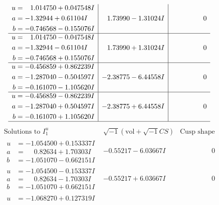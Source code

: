 \documentclass[1p]{elsarticle_modified}
\theoremstyle{definition}
\newcommand{\I}{\sqrt{-1}}
\begin{document}
$$\begin{array}{c|c|c}
\begin{aligned}
u &= \phantom{-}1.014750 + 0.047548 I \\
a &= -1.32944 + 0.61104 I \\
b &= -0.746568 - 0.155076 I\end{aligned}
 & \phantom{-}1.73990 - 1.31024 I & \phantom{-0.000000 } 0 \\ \hline\begin{aligned}
u &= \phantom{-}1.014750 - 0.047548 I \\
a &= -1.32944 - 0.61104 I \\
b &= -0.746568 + 0.155076 I\end{aligned}
 & \phantom{-}1.73990 + 1.31024 I & \phantom{-0.000000 } 0 \\ \hline\begin{aligned}
u &= -0.456859 + 0.862239 I \\
a &= -1.287040 - 0.504597 I \\
b &= -0.161070 - 1.105620 I\end{aligned}
 & -2.38775 - 6.44558 I & \phantom{-0.000000 } 0 \\ \hline\begin{aligned}
u &= -0.456859 - 0.862239 I \\
a &= -1.287040 + 0.504597 I \\
b &= -0.161070 + 1.105620 I\end{aligned}
 & -2.38775 + 6.44558 I & \phantom{-0.000000 } 0\\
 \hline 
 \end{array}$$\newpage$$\begin{array}{c|c|c}  
\text{Solutions to }I^u_{1}& \I (\text{vol} + \sqrt{-1}CS) & \text{Cusp shape}\\
 \hline 
\begin{aligned}
u &= -1.054500 + 0.153337 I \\
a &= \phantom{-}0.82634 + 1.70303 I \\
b &= -1.051070 - 0.662151 I\end{aligned}
 & -0.55217 - 6.03667 I & \phantom{-0.000000 } 0 \\ \hline\begin{aligned}
u &= -1.054500 - 0.153337 I \\
a &= \phantom{-}0.82634 - 1.70303 I \\
b &= -1.051070 + 0.662151 I\end{aligned}
 & -0.55217 + 6.03667 I & \phantom{-0.000000 } 0 \\ \hline\begin{aligned}
u &= -1.068270 + 0.127319 I \\

\end{aligned}
\end{array}$$
\end{document}
